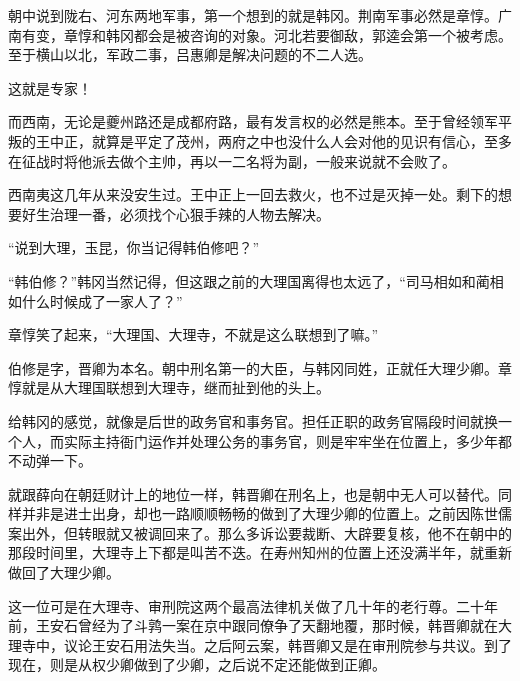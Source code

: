 朝中说到陇右、河东两地军事，第一个想到的就是韩冈。荆南军事必然是章惇。广南有变，章惇和韩冈都会是被咨询的对象。河北若要御敌，郭逵会第一个被考虑。至于横山以北，军政二事，吕惠卿是解决问题的不二人选。

这就是专家！

而西南，无论是夔州路还是成都府路，最有发言权的必然是熊本。至于曾经领军平叛的王中正，就算是平定了茂州，两府之中也没什么人会对他的见识有信心，至多在征战时将他派去做个主帅，再以一二名将为副，一般来说就不会败了。

西南夷这几年从来没安生过。王中正上一回去救火，也不过是灭掉一处。剩下的想要好生治理一番，必须找个心狠手辣的人物去解决。

“说到大理，玉昆，你当记得韩伯修吧？”

“韩伯修？”韩冈当然记得，但这跟之前的大理国离得也太远了，“司马相如和蔺相如什么时候成了一家人了？”

章惇笑了起来，“大理国、大理寺，不就是这么联想到了嘛。”

伯修是字，晋卿为本名。朝中刑名第一的大臣，与韩冈同姓，正就任大理少卿。章惇就是从大理国联想到大理寺，继而扯到他的头上。

给韩冈的感觉，就像是后世的政务官和事务官。担任正职的政务官隔段时间就换一个人，而实际主持衙门运作并处理公务的事务官，则是牢牢坐在位置上，多少年都不动弹一下。

就跟薛向在朝廷财计上的地位一样，韩晋卿在刑名上，也是朝中无人可以替代。同样并非是进士出身，却也一路顺顺畅畅的做到了大理少卿的位置上。之前因陈世儒案出外，但转眼就又被调回来了。那么多诉讼要裁断、大辟要复核，他不在朝中的那段时间里，大理寺上下都是叫苦不迭。在寿州知州的位置上还没满半年，就重新做回了大理少卿。

这一位可是在大理寺、审刑院这两个最高法律机关做了几十年的老行尊。二十年前，王安石曾经为了斗鹑一案在京中跟同僚争了天翻地覆，那时候，韩晋卿就在大理寺中，议论王安石用法失当。之后阿云案，韩晋卿又是在审刑院参与共议。到了现在，则是从权少卿做到了少卿，之后说不定还能做到正卿。

